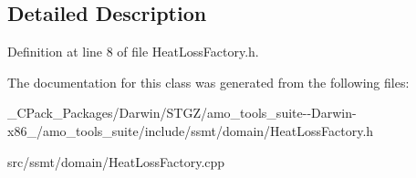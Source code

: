\subsection{Detailed Description}


Definition at line 8 of file Heat\+Loss\+Factory.\+h.



The documentation for this class was generated from the following files\+:\begin{DoxyCompactItemize}
\item 
\+\_\+\+C\+Pack\+\_\+\+Packages/\+Darwin/\+S\+T\+G\+Z/amo\+\_\+tools\+\_\+suite-\/-\/\+Darwin-\/x86\+\_/amo\+\_\+tools\+\_\+suite/include/ssmt/domain/Heat\+Loss\+Factory.\+h\item 
src/ssmt/domain/Heat\+Loss\+Factory.\+cpp\end{DoxyCompactItemize}
